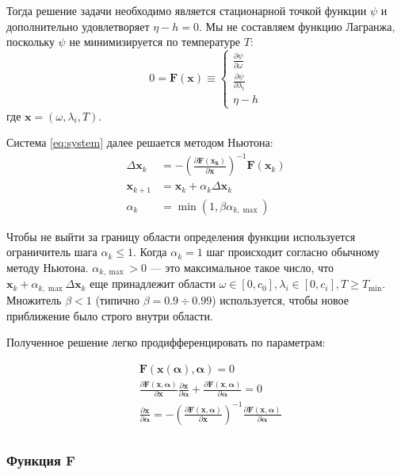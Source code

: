 \documentclass[12pt]{article}
\newcommand{\pd}[2]{\frac{\partial #1}{\partial #2}}
\let\dividesymbol\div
\renewcommand{\div}{\operatorname{div}}
\begin{document}
Тогда решение задачи необходимо является стационарной точкой функции $\psi$ и
дополнительно удовлетворяет $\eta - h = 0$. Мы не составляем функцию Лагранжа,
поскольку $\psi$ не минимизируется по температуре $T$:
\begin{equation}
0 = \mathbf{F}(\mathbf{x}) \equiv
\begin{cases}
 \pd{\psi}{\omega}\\
 \pd{\psi}{\lambda_i}\\
 \eta - h
\end{cases}
\label{eq:system}
\end{equation}
где $\mathbf{x} = (\omega, \lambda_i, T)$.

Система \eqref{eq:system} далее решается методом Ньютона:
\begin{align}
\Delta \mathbf{x}_k &= -\left(\pd{\mathbf{F(\mathbf{x}_k)}}{\mathbf{x}}\right)^{-1}
\mathbf{F}(\mathbf{x}_k)\\
\mathbf{x}_{k+1} &= \mathbf{x}_k + \alpha_k \Delta \mathbf{x}_k\\
\alpha_k &= \min(1, \beta \alpha_{k, \max})
\end{align}

Чтобы не выйти за границу области определения функции используется ограничитель
шага $\alpha_k \leq 1$. Когда $\alpha_k = 1$ шаг происходит согласно обычному
методу Ньютона. $\alpha_{k, \max} > 0$ --- это максимальное такое число, что
$\mathbf{x}_k + \alpha_{k,\max} \Delta \mathbf{x}_{k}$ еще принадлежит области
$\omega \in [0,c_0], \lambda_i \in [0, c_i], T \geq T_{\min}$. Множитель $\beta
< 1$ (типично $\beta = 0.9 \dividesymbol 0.99$) используется, чтобы новое приближение
было строго внутри области.

Полученное решение легко продифференцировать по параметрам:

\begin{align*}
&\mathbf{F}(\mathbf{x}(\boldsymbol \alpha), \boldsymbol \alpha) = 0\\
&\pd{\mathbf{F}(\mathbf{x}, \boldsymbol \alpha)}{\mathbf{x}} \pd{\mathbf{x}}{\boldsymbol \alpha} +
\pd{\mathbf{F}(\mathbf{x}, \boldsymbol \alpha)}{\boldsymbol \alpha} = 0\\
&\pd{\mathbf{x}}{\boldsymbol \alpha} =
-\left(\pd{\mathbf{F}(\mathbf{x}, \boldsymbol \alpha)}{\mathbf{x}}\right)^{-1}
\pd{\mathbf{F}(\mathbf{x}, \boldsymbol \alpha)}{\boldsymbol \alpha} \\
\end{align*}

\subsubsection{Функция $\mathbf{F}$}
\end{document}
